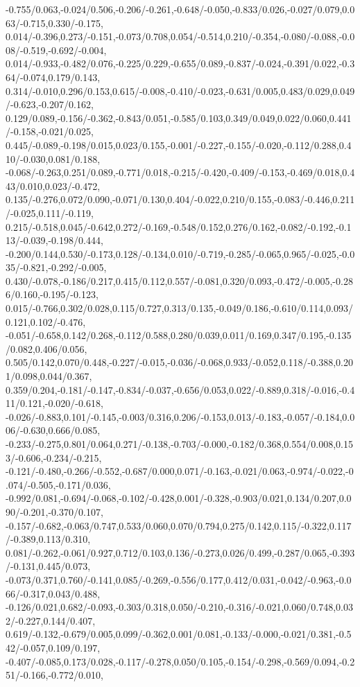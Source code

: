 {-0.755/0.063,-0.024/0.506,-0.206/-0.261,-0.648/-0.050,-0.833/0.026,-0.027/0.079,0.063/-0.715,0.330/-0.175,%
0.014/-0.396,0.273/-0.151,-0.073/0.708,0.054/-0.514,0.210/-0.354,-0.080/-0.088,-0.008/-0.519,-0.692/-0.004,%
0.014/-0.933,-0.482/0.076,-0.225/0.229,-0.655/0.089,-0.837/-0.024,-0.391/0.022,-0.364/-0.074,0.179/0.143,%
0.314/-0.010,0.296/0.153,0.615/-0.008,-0.410/-0.023,-0.631/0.005,0.483/0.029,0.049/-0.623,-0.207/0.162,%
0.129/0.089,-0.156/-0.362,-0.843/0.051,-0.585/0.103,0.349/0.049,0.022/0.060,0.441/-0.158,-0.021/0.025,%
0.445/-0.089,-0.198/0.015,0.023/0.155,-0.001/-0.227,-0.155/-0.020,-0.112/0.288,0.410/-0.030,0.081/0.188,%
-0.068/-0.263,0.251/0.089,-0.771/0.018,-0.215/-0.420,-0.409/-0.153,-0.469/0.018,0.443/0.010,0.023/-0.472,%
0.135/-0.276,0.072/0.090,-0.071/0.130,0.404/-0.022,0.210/0.155,-0.083/-0.446,0.211/-0.025,0.111/-0.119,%
0.215/-0.518,0.045/-0.642,0.272/-0.169,-0.548/0.152,0.276/0.162,-0.082/-0.192,-0.113/-0.039,-0.198/0.444,%
-0.200/0.144,0.530/-0.173,0.128/-0.134,0.010/-0.719,-0.285/-0.065,0.965/-0.025,-0.035/-0.821,-0.292/-0.005,%
0.430/-0.078,-0.186/0.217,0.415/0.112,0.557/-0.081,0.320/0.093,-0.472/-0.005,-0.286/0.160,-0.195/-0.123,%
0.015/-0.766,0.302/0.028,0.115/0.727,0.313/0.135,-0.049/0.186,-0.610/0.114,0.093/0.121,0.102/-0.476,%
-0.051/-0.658,0.142/0.268,-0.112/0.588,0.280/0.039,0.011/0.169,0.347/0.195,-0.135/0.082,0.406/0.056,%
0.505/0.142,0.070/0.448,-0.227/-0.015,-0.036/-0.068,0.933/-0.052,0.118/-0.388,0.201/0.098,0.044/0.367,%
0.359/0.204,-0.181/-0.147,-0.834/-0.037,-0.656/0.053,0.022/-0.889,0.318/-0.016,-0.411/0.121,-0.020/-0.618,%
-0.026/-0.883,0.101/-0.145,-0.003/0.316,0.206/-0.153,0.013/-0.183,-0.057/-0.184,0.006/-0.630,0.666/0.085,%
-0.233/-0.275,0.801/0.064,0.271/-0.138,-0.703/-0.000,-0.182/0.368,0.554/0.008,0.153/-0.606,-0.234/-0.215,%
-0.121/-0.480,-0.266/-0.552,-0.687/0.000,0.071/-0.163,-0.021/0.063,-0.974/-0.022,-0.074/-0.505,-0.171/0.036,%
-0.992/0.081,-0.694/-0.068,-0.102/-0.428,0.001/-0.328,-0.903/0.021,0.134/0.207,0.090/-0.201,-0.370/0.107,%
-0.157/-0.682,-0.063/0.747,0.533/0.060,0.070/0.794,0.275/0.142,0.115/-0.322,0.117/-0.389,0.113/0.310,%
0.081/-0.262,-0.061/0.927,0.712/0.103,0.136/-0.273,0.026/0.499,-0.287/0.065,-0.393/-0.131,0.445/0.073,%
-0.073/0.371,0.760/-0.141,0.085/-0.269,-0.556/0.177,0.412/0.031,-0.042/-0.963,-0.066/-0.317,0.043/0.488,%
-0.126/0.021,0.682/-0.093,-0.303/0.318,0.050/-0.210,-0.316/-0.021,0.060/0.748,0.032/-0.227,0.144/0.407,%
0.619/-0.132,-0.679/0.005,0.099/-0.362,0.001/0.081,-0.133/-0.000,-0.021/0.381,-0.542/-0.057,0.109/0.197,%
-0.407/-0.085,0.173/0.028,-0.117/-0.278,0.050/0.105,-0.154/-0.298,-0.569/0.094,-0.251/-0.166,-0.772/0.010,%
}
